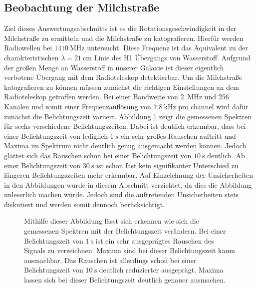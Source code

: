 \subsection{Beobachtung der Milchstraße}
Ziel dieses Auswertungsabschnitts ist es die Rotationsgeschwindigkeit in der Milchstraße zu ermitteln und die Milchstraße zu katografieren.\newline
Hierfür werden Radiowellen bei $\SI{1410}{\mega \hertz}$ untersucht. Diese Frequenz ist das Äquivalent zu der charakteristischen $\lambda = \SI{21}{\centi \metre}$ Linie des H1 Übergangs von Wasserstoff. Aufgrund der großen Menge an Wasserstoff in unserer Galaxie ist dieser eigentlich \dq verbotene\dq{} Übergang mit dem Radioteleskop detektierbar.\newline
Um die Milchstraße katografieren zu können müssen zunächst die richtigen Einstellungen an dem Radioteleskop getroffen werden. Bei einer Bandweite von \SI{2}{MHz} und 256 Kanälen und somit einer Frequenzauflösung von $\SI{7.8}{\kilo \hertz}$ pro channel \cite{Usermanual} wird dafür zunächst die Belichtungszeit variiert. Abbildung \ref{fig:Belichtungszeit} zeigt die gemessenen Spektren für sechs verschiedene Belichtungszeiten. Dabei ist deutlich erkennbar, dass bei einer Belichtungszeit von lediglich $\SI{1}{s}$ ein sehr großes Rauschen auftritt und Maxima im Spektrum nicht deutlich genug ausgemacht werden können. Jedoch glättet sich das Rauschen schon bei einer Belichtungszeit von $\SI{10}{\second}$ deutlich. Ab einer Belichtungszeit von $\SI{30}{\second}$ ist schon fast kein signifikanter Unterschied zu längeren Belichtungszeiten mehr erkennbar. Auf Einzeichnung der Unsicherheiten in den Abbildungen wurde in diesem Abschnitt verzichtet, da dies die Abbildung unleserlich machen würde. Jedoch sind die auftretenden Unsicherheiten stets diskutiert und werden somit dennoch berücksichtigt.
\begin{figure}[H]
    \centering
       
    \caption[Gemessenen Spektren bei verschiedenen Belichtungszeiten]{Mithilfe dieser Abbildung lässt sich erkennen wie sich die gemessenen Spektren mit der Belichtungszeit verändern. Bei einer Belichtungszeit von $\SI{1}{\second}$ ist ein sehr ausgeprägtes Rauschen des Signals zu verzeichnen. Maxima sind bei dieser Belichtungszeit kaum ausmachbar. Das Rauschen ist allerdings schon bei einer Belichtungszeit von $\SI{10}{\second}$ deutlich reduzierter ausgeprägt. Maxima lassen sich bei dieser Belichtungszeit deutlich genauer ausmachen.}
    \label{fig:Belichtungszeit}
\end{figure}

